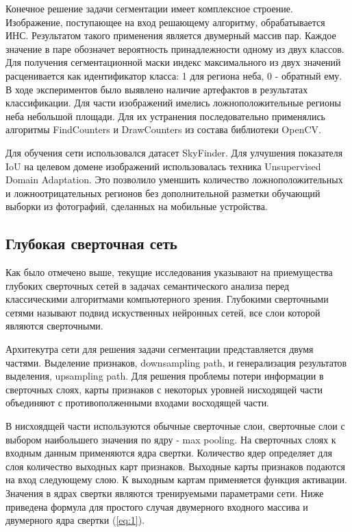 Конечное решение задачи сегментации имеет комплексное строение. Изображение, поступающее на вход решающему алгоритму, обрабатывается ИНС. Результатом такого применения является двумерный массив пар. Каждое значение в паре обозначет вероятность принадлежности одному из двух классов. Для получения сегментационной маски индекс максимального из двух значений расценивается как идентификатор класса: 1 для региона неба, 0 - обратный ему. В ходе экспериментов было выявлено наличие артефактов в результатах классификации. Для части изображений имелись ложноположительные регионы неба небольшой площади. Для их устранения последовательно применялись алгоритмы FindCounters и DrawCounters из состава библиотеки OpenCV. 

Для обучения сети использовался датасет SkyFinder. Для улчушения показателя IoU на целевом домене изображений использовалась техника Unsupervised Domain Adaptation. Это позволило уменшить количество ложноположительных и ложноотрицательных регионов без дополнительной разметки обучающий выборки из фотографий, сделанных на мобильные устройства.

\subsection{Глубокая сверточная сеть}

Как было отмечено выше, текущие исследования указывают на приемущества глубоких сверточных сетей в задачах семантического анализа перед классическими алгоритмами компьютерного зрения. Глубокими сверточными сетями называют подвид искуственных нейронных сетей, все слои которой являются сверточными. 

Архитекутра сети для решения задачи сегментации представляется двумя частями. Выделение признаков, downsampling path, и генерализация результатов выделения, upsampling path. Для решения проблемы потери информации в сверточных слоях, карты признаков с некоторых уровней нисходящей части объединяют с противополженными входами восходящей части.

В нисхоядщей части используются обычные сверточные слои, сверточные слои с выбором наибольшего значения по ядру - max pooling. На сверточных слоях к входным данным применяются ядра свертки. Количество ядер определяет для слоя количество выходных карт признаков. Выходные карты признаков подаются на вход следующему слою. К выходным картам применяется функция активации. Значения в ядрах свертки являются тренируемыми параметрами сети. Ниже приведена формула для простого случая двумерного входного массива и двумерного ядра свертки (\ref{eq:1}).

